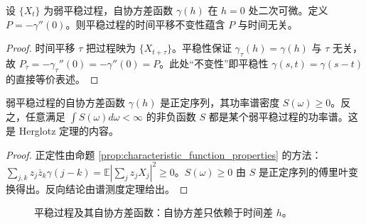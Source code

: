 \begin{proposition}[平稳过程的自协方差二阶导数不变性]\label{ch14_autocovariance_stationarity}
设 $\{X_t\}$ 为弱平稳过程，自协方差函数 $\gamma(h)$ 在 $h = 0$ 处二次可微。定义 $P = -\gamma''(0)$。则平稳过程的时间平移不变性蕴含 $P$ 与时间无关。
\end{proposition}

\begin{proof}
时间平移 $\tau$ 把过程映为 $\{X_{t+\tau}\}$。平稳性保证 $\gamma_{\tau}(h) = \gamma(h)$ 与 $\tau$ 无关，故 $P_{\tau} = -\gamma_{\tau}''(0) = -\gamma''(0) = P$。此处“不变性”即平稳性 $\gamma(s, t) = \gamma(s - t)$ 的直接等价表述。
\end{proof}

\begin{proposition}\label{prop:power_spectrum_positive}
弱平稳过程的自协方差函数 $\gamma(h)$ 是正定序列，其功率谱密度 $S(\omega) \ge 0$。反之，任意满足 $\int S(\omega) d\omega < \infty$ 的非负函数 $S$ 都是某个弱平稳过程的功率谱。这是 Herglotz 定理的内容。
\end{proposition}

\begin{proof}
正定性由命题 \ref{prop:characteristic_function_properties} 的方法：$\sum_{j,k} z_j \bar z_k \gamma(j-k) = \mathbb{E}|\sum_j z_j X_j|^2 \ge 0$。$S(\omega) \ge 0$ 由 $S$ 是正定序列的傅里叶变换得出。反向结论由谱测度定理给出。
\end{proof}

\begin{figure}[htbp]
\centering
{}
\caption{平稳过程及其自协方差函数：自协方差只依赖于时间差 $h$。}
\label{fig:stationary_process}
\end{figure}

